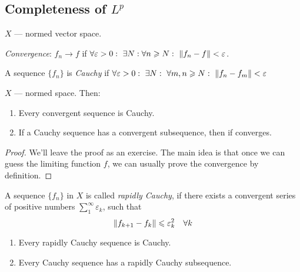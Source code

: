 \subsection{Completeness of $L^p$}
\begin{definition}
    $X$ --- normed vector space.
    
    \textit{Convergence}: 
    $f_n \to f$ if $\forall \varepsilon > 0 :\ \exists N: \forall n \geqslant N:\ \lVert f_n - f\rVert < \varepsilon$.

    A sequence $\{f_n\}$ is \textit{Cauchy} if 
    $
        \forall \varepsilon > 0: \
        \exists N:\ \forall m, n \geqslant N:\ \lVert f_n - f_m\rVert < \varepsilon
    $
\end{definition}
\begin{proposition}
    $X$ --- normed space. Then:
    \begin{enumerate}
        \item {
            Every convergent sequence is Cauchy.
        }
        \item {
            If a Cauchy sequence has a convergent subsequence, then
            if converges.
        }
    \end{enumerate}
\end{proposition}
\begin{proof}
    We'll leave the proof as an exercise. The main idea is that
    once we can guess the limiting function $f$,
    we can usually prove the convergence by definition.
\end{proof}
\begin{definition}
    A sequence $\{f_n\}$ in $X$ is called \textit{rapidly Cauchy}, if there
    exists a convergent series of positive numbers
    $\sum_1^\infty \varepsilon_k$, such that
    \[ \lVert f_{k+1} - f_k\rVert \leqslant \varepsilon_k^2 \quad \forall k \]
\end{definition}
\begin{proposition}
    \begin{enumerate}
        \item {
            Every rapidly Cauchy sequence is Cauchy.
        }
        \item {
            Every Cauchy sequence has a rapidly Cauchy subsequence.
        }
    \end{enumerate}
\end{proposition}
